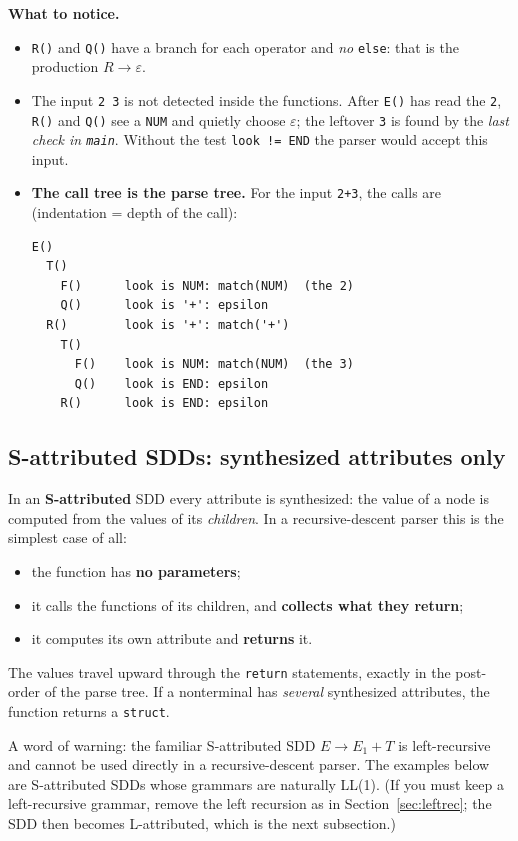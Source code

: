 \documentclass[11pt,a4paper]{article}
\begin{document}
\textbf{What to notice.}
\begin{itemize}[nosep]
\item \texttt{R()} and \texttt{Q()} have a branch for each operator and \emph{no} \texttt{else}: that is the production $R\to\varepsilon$.
\item The input \texttt{2 3} is not detected inside the functions. After \texttt{E()} has read the \texttt{2}, \texttt{R()} and \texttt{Q()} see a \texttt{NUM} and quietly choose $\varepsilon$; the leftover \texttt{3} is found by the \emph{last check in \texttt{main}}. Without the test \texttt{look != END} the parser would accept this input.
\item \textbf{The call tree is the parse tree.} For the input \texttt{2+3}, the calls are (indentation = depth of the call):
\begin{lstlisting}[basicstyle=\ttfamily\footnotesize]
E()
  T()
    F()      look is NUM: match(NUM)  (the 2)
    Q()      look is '+': epsilon
  R()        look is '+': match('+')
    T()
      F()    look is NUM: match(NUM)  (the 3)
      Q()    look is END: epsilon
    R()      look is END: epsilon
\end{lstlisting}
\end{itemize}

\subsection{S-attributed SDDs: synthesized attributes only}
\label{sec:rdsattr}

In an \textbf{S-attributed} SDD every attribute is synthesized: the value of a node is computed from the values of its \emph{children}. In a recursive-descent parser this is the simplest case of all:
\begin{itemize}[nosep]
\item the function has \textbf{no parameters};
\item it calls the functions of its children, and \textbf{collects what they return};
\item it computes its own attribute and \textbf{returns} it.
\end{itemize}
The values travel upward through the \texttt{return} statements, exactly in the post-order of the parse tree. If a nonterminal has \emph{several} synthesized attributes, the function returns a \texttt{struct}.

A word of warning: the familiar S-attributed SDD $E\to E_1+T$ is left-recursive and cannot be used directly in a recursive-descent parser. The examples below are S-attributed SDDs whose grammars are naturally LL(1). (If you must keep a left-recursive grammar, remove the left recursion as in Section~\ref{sec:leftrec}; the SDD then becomes L-attributed, which is the next subsection.)
\end{document}
